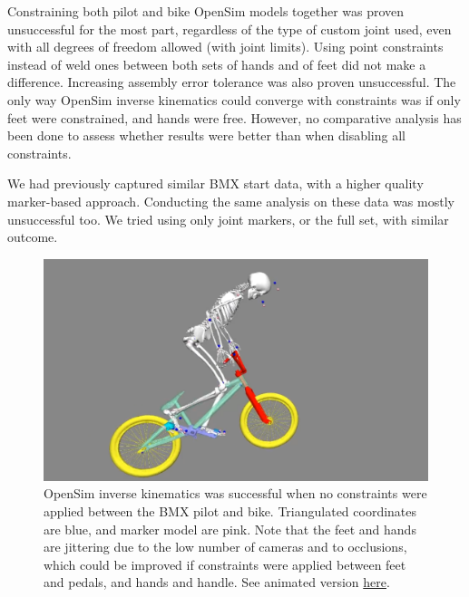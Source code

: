 Constraining both pilot and bike OpenSim models together was proven unsuccessful for the most part, regardless of the type of custom joint used, even with all degrees of freedom allowed (with joint limits). Using point constraints instead of weld ones between both sets of hands and of feet did not make a difference. Increasing assembly error tolerance was also proven unsuccessful. The only way OpenSim inverse kinematics could converge with constraints was if only feet were constrained, and hands were free. However, no comparative analysis has been done to assess whether results were better than when disabling all constraints.

We had previously captured similar BMX start data, with a higher quality marker-based approach. Conducting the same analysis on these data was mostly unsuccessful too. We tried using only joint markers, or the full set, with similar outcome. %

\begin{figure}[hbtp]
	\centering
	\def\svgwidth{1\columnwidth}
	\fontsize{10pt}{10pt}\selectfont
	\includegraphics[width=\linewidth]{"../Chap7/Figures/BMXPilot.png"}
	\caption{OpenSim inverse kinematics was successful when no constraints were applied between the BMX pilot and bike. Triangulated coordinates are blue, and marker model are pink. Note that the feet and hands are jittering due to the low number of cameras and to occlusions, which could be improved if constraints were applied between feet and pedals, and hands and handle. See animated version \href{https://github.com/perfanalytics/pose2sim/blob/main/Content/Activities_verylow.gif}{here}.}
	\label{fig_bmxpilot}
\end{figure}


